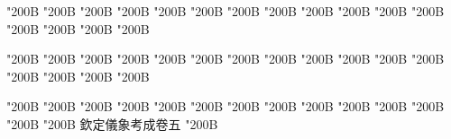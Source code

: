 \begin{正文}
\char"200B\relax{}
\char"200B\relax{}
\char"200B\relax{}
\char"200B\relax{}
\char"200B\relax{}
\char"200B\relax{}
\char"200B\relax{}
\char"200B\relax{}
\char"200B\relax{}
\char"200B\relax{}
\char"200B\relax{}
\char"200B\relax{}
\char"200B\relax{}
\char"200B\relax{}
\char"200B\relax{}
\char"200B\relax
{}\par
\end{正文}\clearpage
{}
\begin{正文}
\char"200B\relax{}
\char"200B\relax{}
\char"200B\relax{}
\char"200B\relax{}
\char"200B\relax{}
\char"200B\relax{}
\char"200B\relax{}
\char"200B\relax{}
\char"200B\relax{}
\char"200B\relax{}
\char"200B\relax{}
\char"200B\relax{}
\char"200B\relax{}
\char"200B\relax{}
\char"200B\relax{}
\char"200B\relax
{}\par
\end{正文}\clearpage
{}
\begin{正文}
\char"200B\relax{}
\char"200B\relax{}
\char"200B\relax{}
\char"200B\relax{}
\char"200B\relax{}
\char"200B\relax{}
\char"200B\relax{}
\char"200B\relax{}
\char"200B\relax{}
\char"200B\relax{}
\char"200B\relax{}
\char"200B\relax{}
\char"200B\relax{}
\char"200B\relax{}
欽定儀象考成卷五
\char"200B\relax
\par

\par\end{正文}\clearpage

